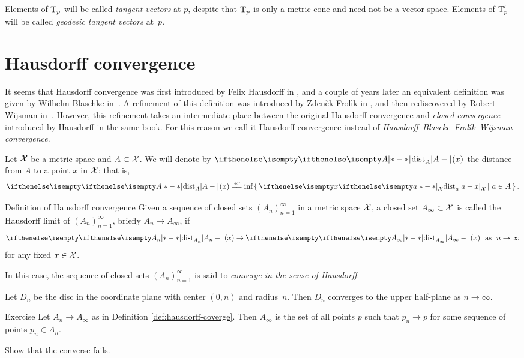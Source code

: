 Elements of $\text{\rm T}_p$ will be called 
\emph{tangent vectors} 
at $p$,
despite that $\text{\rm T}_p$ is only a metric cone and need not be a vector space.
Elements of $\text{\rm T}'_p$ will be called 
\emph{geodesic tangent vectors} 
at~$p$.

\section{Hausdorff convergence}

It seems that Hausdorff convergence was first introduced by Felix Hausdorff in \cite{hausdorff},
and a couple of years later an equivalent definition was given by Wilhelm Blaschke in~\cite{blaschke}.
A refinement of this definition was introduced by  Zden\v{e}k Frol\'{\i}k in \cite{frolik},
and then rediscovered by Robert Wijsman in~\cite{wijsman}.  
However, this refinement takes an intermediate place between the original Hausdorff convergence and {}\emph{closed convergence} introduced by Hausdorff in the same book. 
For this reason we call it Hausdorff convergence
instead of
{}\emph{Hausdorff--Blascke--Frol\'{\i}k--Wijsman convergence}.


Let $\mathcal{X}$ be a metric space and $A\subset \spc{X}$.
We will denote by $\dist{A}{}{}(x)$ the distance from $A$ to a point $x$ in $\mathcal{X}$;
that is,
$$\dist{A}{}{}(x)\df\inf\set{\dist{a}{x}{\spc{X}}}{a\in A}.$$

\begin{thm}{Definition of Hausdorff convergence}\label{def:hausdorff-coverge}
Given a sequence of closed sets $(A_n)_{n=1}^\infty$ in a metric space $\mathcal{X}$, 
a closed set $A_\infty\subset \spc{X}$ is called the Hausdorff limit of $(A_n)_{n=1}^\infty$,
briefly $A_n\to A_\infty$, if 
$$\dist{A_n}{}{}(x)\to\dist{A_\infty}{}{}(x)\ \ \t{as}\ \ n\to\infty$$
for any fixed $x\in \spc{X}$.

In this case, the sequence of closed sets $(A_n)_{n=1}^\infty$ is said to \emph{converge in the sense of Hausdorff}.
\end{thm}

Let $D_n$ be the disc in the coordinate plane 
with center $(0,n)$ and radius~$n$.
Then $D_n$ converges to the upper half-plane as $n\to\infty$. 

\begin{thm}{Exercise}\label{ex:hausdorff-conv}
Let $A_n\to A_\infty$ as in Definition \ref{def:hausdorff-coverge}.  Then $A_\infty$ is the set of all points $p$ such that   $p_n\to p$ for some sequence of points  $p_n\in A_n$.

Show that the converse fails.
\end{thm}

